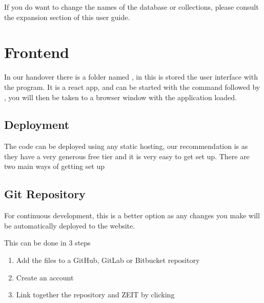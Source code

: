 \documentclass[letterpaper,10pt,english]{sphinxmanual}
\begin{document}
If you do want to change the names of the database or collections,
please consult the expansion section of this user guide.


\section{Frontend}
\label{\detokenize{docs/Installation/frontEnd:frontend}}\label{\detokenize{docs/Installation/frontEnd::doc}}
In our handover there is a folder named , in this is stored
the user interface with the program. It is a react app, and can be
started with the command  followed by , you
will then be taken to a browser window with the application loaded.


\subsection{Deployment}
\label{\detokenize{docs/Installation/frontEnd:deployment}}
The code can be deployed using any static hosting, our
recommendation is  as they have a very
generous free tier and it is very easy to get set up. There are two main
ways of getting set up


\subsection{Git Repository}
\label{\detokenize{docs/Installation/frontEnd:git-repository}}

For continuous development, this is a better option as any changes you
make will be automatically deployed to the website.

This can be done in 3 steps
\begin{enumerate}
%
\item {} 
Add the files to a GitHub, GitLab or Bitbucket repository

\item {} 
Create an account 

\item {} 
Link together the repository and ZEIT by clicking 

\end{enumerate}
\end{document}
